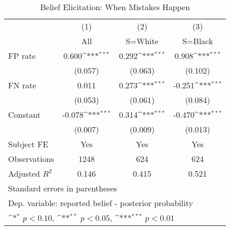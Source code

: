 \begin{table}[htbp]\centering
\def\sym#1{\ifmmode^{#1}\else\(^{#1}\)\fi}
\caption{Belief Elicitation: When Mistakes Happen}
\begin{tabular}{l*{3}{c}}
\hline\hline
                &\multicolumn{1}{c}{(1)}&\multicolumn{1}{c}{(2)}&\multicolumn{1}{c}{(3)}\\
                &\multicolumn{1}{c}{All}&\multicolumn{1}{c}{S=White}&\multicolumn{1}{c}{S=Black}\\
\hline
FP rate         &    0.600\sym{***}&    0.292\sym{***}&    0.908\sym{***}\\
                &  (0.057)         &  (0.063)         &  (0.102)         \\
FN rate         &    0.011         &    0.273\sym{***}&   -0.251\sym{***}\\
                &  (0.053)         &  (0.061)         &  (0.084)         \\
Constant        &   -0.078\sym{***}&    0.314\sym{***}&   -0.470\sym{***}\\
                &  (0.007)         &  (0.009)         &  (0.013)         \\
Subject FE      &      Yes         &      Yes         &      Yes         \\
\hline
Observations    &     1248         &      624         &      624         \\
Adjusted \(R^{2}\)&    0.146         &    0.415         &    0.521         \\
\hline\hline
\multicolumn{4}{l}{\footnotesize Standard errors in parentheses}\\
\multicolumn{4}{l}{\footnotesize Dep. variable: reported belief - posterior probability}\\
\multicolumn{4}{l}{\footnotesize \sym{*} \(p<0.10\), \sym{**} \(p<0.05\), \sym{***} \(p<0.01\)}\\
\end{tabular}
\end{table}
